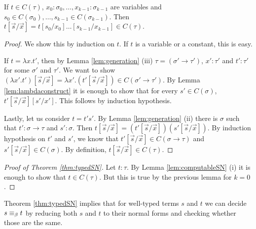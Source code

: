 \begin{boxlem}
    If $t \in C(\tau)$, $x_0 : \sigma_0, \dots, x_{k-1} : \sigma_{k-1}$ are variables and $s_0 \in C(\sigma_0), \dots, s_{k-1} \in C(\sigma_{k-1})$. 
    Then $t[\vec{s}/\vec{x}] = t [s_0 / x_0] \dots [s_{k-1} / x_{k - 1}] \in C(\tau)$.
\end{boxlem}
\begin{proof}
    We show this by induction on $t$.
    If $t$ is a variable or a constant, this is easy. 

    If $t = \lambda x. t'$, then by Lemma \ref{lem:generation} (iii) $\tau = (\sigma' \to \tau')$, $x' : \tau'$ and $t' : \tau'$ for some $\sigma'$ and $\tau'$.
    We want to show $(\lambda x'.t')[\vec{s}/\vec{x}] = \lambda x'. (t'[\vec{s}/\vec{x}]) \in C(\sigma' \to \tau')$.
    By Lemma \ref{lem:lambdaconstruct} it is enough to show that for every $s' \in C(\sigma)$, $t'[\vec{s}/\vec{x}][s' / x']$. 
    This follows by induction hypothesis. 

    Lastly, let us consider $t = t's'$.
    By Lemma \ref{lem:generation} (ii) there is $\sigma$ such that $t' : \sigma \to \tau$ and $s' : \sigma$. 
    Then $t[\vec{s}/\vec{x}] = (t'[\vec{s}/\vec{x}])(s' [\vec{s}/\vec{x}])$.
    By induction hypothesis on $t'$ and $s'$, we know that $t'[\vec{s}/\vec{x}] \in C(\sigma \to \tau)$ and $s'[\vec{s} / \vec{x}] \in C(\sigma)$. 
    By definition, $t[\vec{s} / \vec{x}] \in C(\tau)$.
\end{proof}

\begin{proof}[Proof of Theorem \ref{thm:typedSN}]
    Let $t : \tau$.
    By Lemma \ref{lem:computableSN} (i) it is enough to show that $t \in C(\tau)$. 
    But this is true by the previous lemma for $k = 0$.
\end{proof}

\begin{rem}
    Theorem \ref{thm:typedSN} implies that for well-typed terms $s$ and $t$ we can decide $s \equiv_{\beta} t$ by reducing both $s$ and $t$ to their normal forms and checking whether those are the same.
\end{rem}